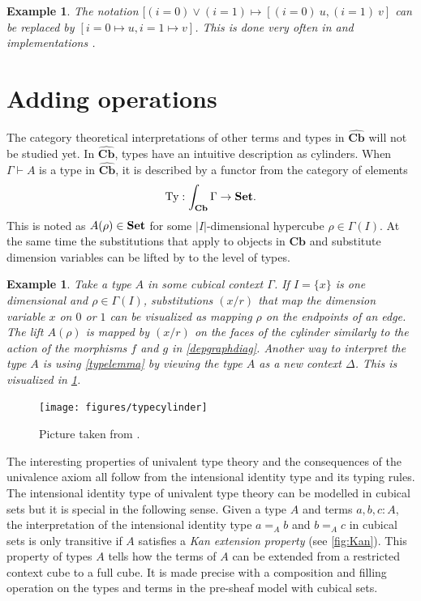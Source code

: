 \documentclass[12pt,a4paper,twoside,xetex]{book} %
\newcommand{\keyword}[1]{\emph{#1}\index{#1}}
\newtheorem{example}[theorem]{Example}
\newcommand{\psh}[1]{\widehat{#1}}
\newcommand{\cube}[0]{\textbf{Cb}}
\begin{document}
\begin{example}
The notation $[(i = 0) \vee (i=1) \mapsto [(i=0) \ u, (i=1)\  v]$ can 
be replaced by $[i=0 \mapsto u, i=1 \mapsto v]$. This is done very often in 
\cite{Huber2016} and implementations \cite{Moertberg2018}.
\end{example}


\section{Adding operations}\label{extraops}

The category theoretical interpretations of other 
terms and types in $\psh{\cube}$ will not be studied yet. In $\psh{\cube}$, types have an intuitive description as cylinders. When $\Gamma \vdash A$ is a type in $\psh{\cube}$, it is described by a functor from the category of elements 
$$\text{Ty}:\int_{\cube} \Gamma \rightarrow \set.$$ This is noted as $A(\rho) \in \text{\textbf{Set}}$ for some $|I|$-dimensional hypercube $\rho 
\in \Gamma (I)$. At the same time the substitutions that apply to objects in $\cube$ and substitute dimension variables can 
be lifted by  to the level of types. 

\begin{example}
Take a type $A$ in some cubical context $\Gamma$. If $I=\{x\}$ is one dimensional and $\rho \in \Gamma(I)$, substitutions $(x/r)$ that 
map the dimension variable $x$ on $0$ or $1$ can be visualized as mapping $\rho$ on the endpoints of an edge. The lift $A(\rho)$ is mapped by $(x/r)$ on the faces of the 
cylinder similarly to the action of the morphisms $f$ and $g$ in \cref{depgraphdiag}. Another way to interpret the type $A$ is using \cref{typelemma} by viewing the type $A$ as a new context $\Delta$.  This is visualized in \cref{hubtypes}. 
\end{example}

\begin{figure}\label{hubtypes}
 \centering
 \texttt{[image: figures/typecylinder]}
 \caption{Picture taken from \cite{Huber2016def}.}
\end{figure}

The interesting properties of univalent type theory and the 
consequences of the univalence axiom all follow from the intensional identity 
type and its typing rules. The intensional identity type of univalent type 
theory can be modelled in cubical sets but it is special in the following 
sense. Given a type $A$ and terms $a,b,c:A$, the interpretation of the 
intensional identity type $a =_A b$ and $b=_A c$  in cubical sets is only 
transitive if $A$ satisfies a \keyword{Kan extension property} (see 
\cref{fig:Kan}). This property of types $A$ tells how the terms of $A$ can be 
extended from a restricted context cube to a full cube. It is made precise with 
a composition and filling operation on the types and terms in the pre-sheaf 
model with cubical sets.
\end{document}
